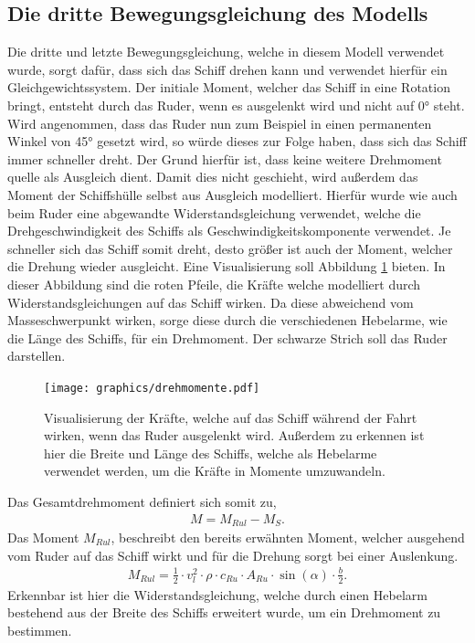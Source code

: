 \documentclass[]{iat}
\begin{document}
\subsection{Die dritte Bewegungsgleichung des Modells} \label{sec:eom3}
Die dritte und letzte Bewegungsgleichung, welche in diesem Modell verwendet wurde, sorgt dafür, dass sich das Schiff drehen kann und verwendet hierfür ein Gleichgewichtssystem. Der initiale Moment, welcher das Schiff in eine Rotation bringt, entsteht durch das Ruder, wenn es ausgelenkt wird und nicht auf 0° steht. Wird angenommen, dass das Ruder nun zum Beispiel in einen permanenten Winkel von 45° gesetzt wird, so würde dieses zur Folge haben, dass sich das Schiff immer schneller dreht. Der Grund hierfür ist, dass keine weitere Drehmoment quelle als Ausgleich dient. Damit dies nicht geschieht, wird außerdem das Moment der Schiffshülle selbst aus Ausgleich modelliert. Hierfür wurde wie auch beim Ruder eine abgewandte Widerstandsgleichung verwendet, welche die Drehgeschwindigkeit des Schiffs als Geschwindigkeitskomponente verwendet. Je schneller sich das Schiff somit dreht, desto größer ist auch der Moment, welcher die Drehung wieder ausgleicht. Eine Visualisierung soll Abbildung \ref{abb:drehmomente} bieten. In dieser Abbildung sind die roten Pfeile, die Kräfte welche modelliert durch Widerstandsgleichungen auf das Schiff wirken. Da diese abweichend vom Masseschwerpunkt wirken, sorge diese durch die verschiedenen Hebelarme, wie die Länge des Schiffs, für ein Drehmoment. Der schwarze Strich soll das Ruder darstellen.
\begin{figure}[H]
    \texttt{[image: graphics/drehmomente.pdf]}
    \centering
    \caption{Visualisierung der Kräfte, welche auf das Schiff während der Fahrt wirken, wenn das Ruder ausgelenkt wird. Außerdem zu erkennen ist hier die Breite und Länge des Schiffs, welche als Hebelarme verwendet werden, um die Kräfte in Momente umzuwandeln.}
    \label{abb:drehmomente}
\end{figure}
Das Gesamtdrehmoment definiert sich somit zu,
\begin{align}
    M = M_{Rul} - M_S.
\end{align}
Das Moment $M_{Rul}$, beschreibt den bereits erwähnten Moment, welcher ausgehend vom Ruder auf das Schiff wirkt und für die Drehung sorgt bei einer Auslenkung.
\begin{align}
    M_{Rul} = \frac{1}{2} \cdot v_l^2 \cdot \rho \cdot c_{Ru} \cdot A_{Ru} \cdot \sin(\alpha) \cdot \frac{b}{2}.
\end{align}
Erkennbar ist hier die Widerstandsgleichung, welche durch einen Hebelarm bestehend aus der Breite des Schiffs erweitert wurde, um ein Drehmoment zu bestimmen.
\end{document}
